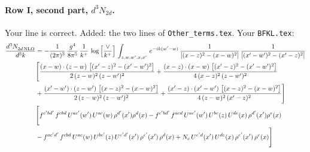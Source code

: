\documentclass[10pt]{article}
\numberwithin{equation}{section}
\newcommand{\new}[1]{{\color{blue}#1}}
\begin{document}
\paragraph{Row I, second part, $d^3N_{2d}$.}
Your line is correct. \new{Added}: the two lines of \texttt{Other\_terms.tex}.
\noindent Your \texttt{BFKL.tex}:
\begin{align}
 \frac{d^{3}N_{2d\,\rm NLO}^{\rm}}{d^{3}k}  & =  -\frac{1}{(2\pi)^{3}}\, \frac{g^{4}}{8\pi^{5}}\,\frac{1}{k^{+}}\,\log{\left[\frac{\vee}{k^{+}}\right]}\,\int_{z,w,w^{\prime},x,x'}\, e^{-ik(w^{\prime}-w)}\,\frac{1}{\left[(x-z)^{2}-(x-w)^{2}\right]}\, \frac{1}{\left[(x'-w')^{2}-(x'-z)^{2}\right]}\notag \\ & \Bigg[\frac{(x-w)\cdot (z-w)\, \left[(x'-z)^{2}-(x'-w')^{2}\right]}{2\, (z-w)^{2}\, (z-w')^{2}}  + \frac{(x-z)\cdot (x-w)\,\left[(x'-z)^{2}-(x'-w')^{2}\right] }{4\,(x-z)^{2}\,(z-w')^{2}}\notag \\ & +\frac{(x'-w')\cdot (z-w')\, \left[(x-z)^{2}-(x-w)^{2}\right]}{2\, (z-w)^{2}\, (z-w')^{2}}+ \frac{(x'-z)\cdot (x'-w')\, \left[(x-z)^{2}-(x-w)^{2}\right]}{4\, (z-w)^{2}\,(x'-z)^{2}}\Bigg] \notag \\ &  \Bigg[f^{c'bd'}\,f^{cbd}\, U^{ac'}(w')\,U^{ac}(w)\,\rho^{d'}(x')\rho^{d}(x)- f^{c'bd'}\,f^{acd}\,U^{ac'}(w')\,U^{bc}(z)\,U^{de}(x)\,\rho^{d'}(x')\rho^{e}(x) \notag \\ & -f^{ac'd'}\,f^{cbd}\,U^{ac}(w)\,U^{bc'}(z)\,U^{e'd'}(x')\,\rho^{e'}(x')\,\rho^{d}(x) +N_{c}\,U^{e'd}(x')\,U^{de}(x)\,\rho^{e'}(x')\,\rho^{e}(x)\Bigg] \label{eq:Byour:G2I2d}
\end{align}
\end{document}
